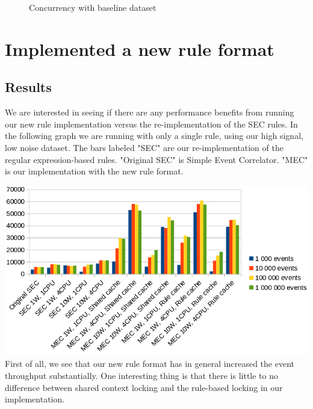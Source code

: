 \begin{figure}[ht]
\centering
\pgfplotsset{scaled y ticks=false}
\caption{Concurrency with baseline dataset}
\label{fig:multicore-b-perf}
\end{figure}

\section{Implemented a new rule format}
\subsection{Results}
We are interested in seeing if there are any performance benefits from running our new rule implementation versus the re-implementation of the SEC rules. In the following graph we are running with only a single rule, using our high signal, low noise dataset. The bars labeled "SEC" are our re-implementation of the regular expression-based rules. "Original SEC" is Simple Event Correlator. "MEC" is our implementation with the new rule format.

\includegraphics[scale=0.525]{figures/new-rule-format/performance.png}
\\
First of all, we see that our new rule format has in general increased the event throughput substantially. One interesting thing is that there is little to no difference between shared context locking and the rule-based locking in our implementation.

